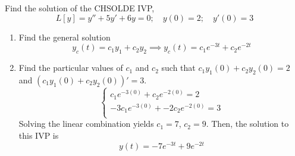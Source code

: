 \documentclass[diffeq.tex]{subfiles}
\begin{document}
\begin{example}
    Find the solution of the CHSOLDE IVP,
    \begin{equation}
        L[y] = y'' + 5y' + 6y = 0;\quad y(0) = 2;\quad y'(0) = 3
    \end{equation}
    \begin{enumerate}
        \item Find the general solution
        \begin{equation}
            y_{c}(t) = c_{1}y_{1} + c_{2}y_{2} \implies y_{c}(t) = c_{1}e^{-3t} + c_{2}e^{-2t}
        \end{equation}
        \item Find the particular values of $c_{1}$ and $c_{2}$ such that $c_{1}y_{1}(0) + c_{2}y_{2}(0) = 2$ and $(c_{1}y_{1}(0) + c_{2}y_{2}(0))' = 3$.
        \begin{equation}
            \begin{cases}
                c_{1}e^{-3(0)} + c_{2}e^{-2(0)} = 2\\
                -3c_{1}e^{-3(0)} + -2c_{2}e^{-2(0)} = 3\\
            \end{cases}
        \end{equation}
        Solving the linear combination yields $c_{1} = 7$, $c_{2} = 9$.
        Then, the solution to this IVP is
        \begin{equation}
            y(t) = -7e^{-3t} + 9 e^{-2t}
        \end{equation}
    \end{enumerate}
\end{example}
\end{document}
